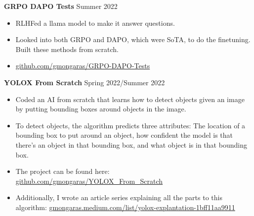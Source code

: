 \documentclass[a4paper,10pt]{article}
\begin{document}
\noindent\textbf{GRPO DAPO Tests} \hfill Summer 2022
\begin{itemize}[noitemsep,topsep=0pt]
  \item RLHFed a llama model to make it answer questions.
  \item Looked into both GRPO and DAPO, which were SoTA, to do the finetuning. Built these methods from scratch.
  \item \href{https://github.com/gmongaras/GRPO-DAPO-Tests}{github.com/gmongaras/GRPO-DAPO-Tests}
\end{itemize}

\noindent\textbf{YOLOX From Scratch} \hfill Spring 2022/Summer 2022
\begin{itemize}[noitemsep,topsep=0pt]
  \item Coded an AI from scratch that learns how to detect objects given an image by putting bounding boxes around objects in the image.
  \item To detect objects, the algorithm predicts three attributes: The location of a bounding box to put around an object, how confident the model is that there’s an object in that bounding box, and what object is in that bounding box.
  \item  The project can be found here: \href{https://github.com/gmongaras/YOLOX_From_Scratch}{github.com/gmongaras/YOLOX\_From\_Scratch}
  \item  Additionally, I wrote an article series explaining all the parts to this algorithm:
\href{https://gmongaras.medium.com/list/yolox-explantation-1bff11aa9911}{gmongaras.medium.com/list/yolox-explantation-1bff11aa9911}
\end{itemize}
\end{document}
